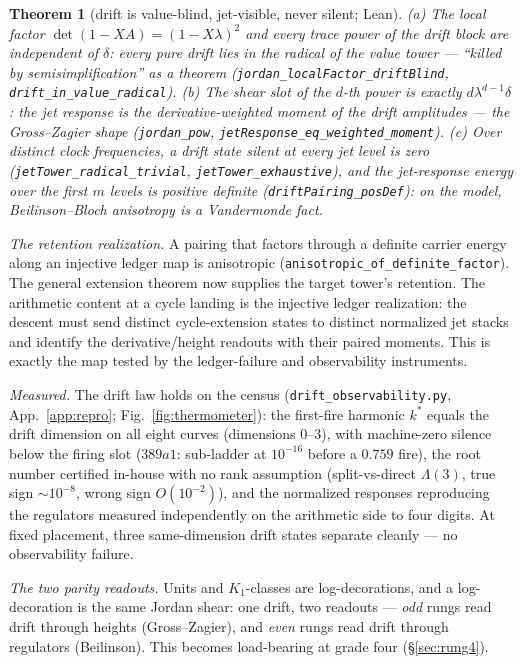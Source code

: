 \documentclass[11pt]{article}
\newtheorem{theorem}{Theorem}[section]
\theoremstyle{definition}
\theoremstyle{remark}
\begin{document}
\begin{theorem}[drift is value-blind, jet-visible, never silent; Lean]
\label{thm:drift}
\textup{(a)} The local factor $\det(1-XA)=(1-X\lambda)^2$ and every trace power
of the drift block are independent of $\delta$: every pure drift lies in the
radical of the value tower --- ``killed by semisimplification'' as a theorem
\textup{(\texttt{jordan\_localFactor\_driftBlind},
\texttt{drift\_in\_value\_radical})}.
\textup{(b)} The shear slot of the $d$-th power is exactly
$d\lambda^{d-1}\delta$: the jet response is the derivative-weighted moment of
the drift amplitudes --- the Gross--Zagier shape
\textup{(\texttt{jordan\_pow}, \texttt{jetResponse\_eq\_weighted\_moment})}.
\textup{(c)} Over distinct clock frequencies, a drift state silent at every jet
level is zero \textup{(\texttt{jetTower\_radical\_trivial},
\texttt{jetTower\_exhaustive})}, and the jet-response energy over the first $m$
levels is positive definite \textup{(\texttt{driftPairing\_posDef})}: on the
model, Beilinson--Bloch anisotropy is a Vandermonde fact.
\end{theorem}

\noindent\emph{The retention realization.} A pairing that factors through a
definite carrier energy along an injective ledger map is anisotropic
(\texttt{anisotropic\_of\_definite\_factor}). The general extension theorem
now supplies the target tower's retention. The arithmetic content at a cycle
landing is the injective ledger realization: the descent must send distinct
cycle-extension states to distinct normalized jet stacks and identify the
derivative/height readouts with their paired moments. This is exactly the map
tested by the ledger-failure and observability instruments.

\noindent\emph{Measured.} The drift law holds on the census
(\texttt{drift\_observability.py}, App.~\ref{app:repro};
Fig.~\ref{fig:thermometer}): the first-fire harmonic $k^*$ equals the drift
dimension on all eight curves (dimensions $0$--$3$), with machine-zero silence
below the firing slot ($389a1$: sub-ladder at $10^{-16}$ before a $0.759$
fire), the root number certified in-house with no rank assumption
(split-vs-direct $\Lambda(3)$, true sign $\sim10^{-8}$, wrong sign
$O(10^{-2})$), and the normalized responses reproducing the regulators
measured independently on the arithmetic side to four digits. At fixed
placement, three same-dimension drift states separate cleanly --- no
observability failure.

\noindent\emph{The two parity readouts.} Units and $K_1$-classes are
log-decorations, and a log-decoration is the same Jordan shear: one drift, two
readouts --- \emph{odd} rungs read drift through heights (Gross--Zagier), and
\emph{even} rungs read drift through regulators (Beilinson). This becomes
load-bearing at grade four (\S\ref{sec:rung4}).
\end{document}
